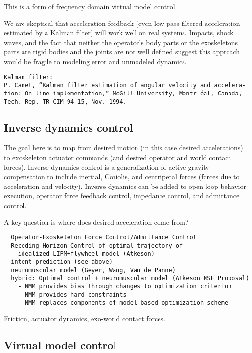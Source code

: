 \documentclass[letterpaper,12pt,fullpage]{article}
\begin{document}
This is a form of frequency domain virtual model control.

We are skeptical that acceleration feedback (even low pass filtered acceleration
estimated by a Kalman filter) will
work well on real systems. Impacts, shock waves, and the fact that neither
the operator's body parts or the exoskeletons parts are rigid bodies and the
joints are not well defined suggest this approach would be fragile to modeling
error and unmodeled dynamics.

\begin{verbatim}
Kalman filter:
P. Canet, “Kalman filter estimation of angular velocity and accelera-
tion: On-line implementation,” McGill University, Montr ́eal, Canada,
Tech. Rep. TR-CIM-94-15, Nov. 1994.
\end{verbatim}

\subsection{Inverse dynamics control}

The goal here is to map from desired motion (in this case desired
accelerations) to exoskeleton actuator commands (and desired operator
and world contact forces).
Inverse dynamics control is a generalization of active gravity compensation to include
inertial, Coriolis, and centripetal forces (forces due to acceleration and
velocity).
Inverse dynamics can be added to open loop behavior execution, operator force
feedback control, impedance control, and admittance control.

A key question is where does desired acceleration come from?
\begin{verbatim}
  Operator-Exoskeleton Force Control/Admittance Control  
  Receding Horizon Control of optimal trajectory of 
    idealized LIPM+flywheel model (Atkeson)
  intent prediction (see above)
  neuromuscular model (Geyer, Wang, Van de Panne)
  hybrid: Optimal control + neuromuscular model (Atkeson NSF Proposal)
    - NMM provides bias through changes to optimization criterion
    - NMM provides hard constraints
    - NMM replaces components of model-based optimization scheme
\end{verbatim}

Friction, actuator dynamics, exo-world contact forces.

\subsection{Virtual model control}
\end{document}
